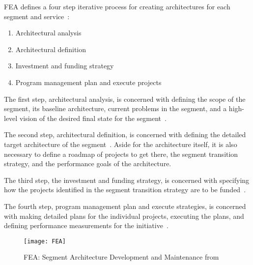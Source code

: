 
FEA defines a four step iterative process for creating architectures for each segment and service~\cite{FEA_PMO2007}:
\begin{enumerate}
    \item Architectural analysis
    \item Architectural definition
    \item Investment and funding strategy
    \item Program management plan and execute projects
\end{enumerate}


The first step, architectural analysis, is concerned with defining the scope of the segment, its baseline architecture, current problems in the segment, and a high-level vision of the desired final state for the segment~\cite{FEA_PMO2007}.

The second step, architectural definition, is concerned with defining the detailed target architecture of the segment~\cite{FEA_PMO2007}. Aside for the architecture itself, it is also necessary to define a roadmap of projects to get there, the segment transition strategy, and the performance goals of the architecture. 
  
The third step, the investment and funding strategy, is concerned with specifying how the projects identified in the segment transition strategy are to be funded~\cite{FEA_PMO2007}. 

The fourth step, program management plan and execute strategies, is concerned with making detailed plans for the individual projects, executing the plans, and defining performance measurements for the initiative~\cite{FEA_PMO2007}.
\begin{figure}
\centering
\texttt{[image: FEA]}
\caption{FEA: Segment Architecture Development and Maintenance from ~\cite{FEA_PMO2007}}
\label{fig:FEA_segmentDev}
\end{figure}

